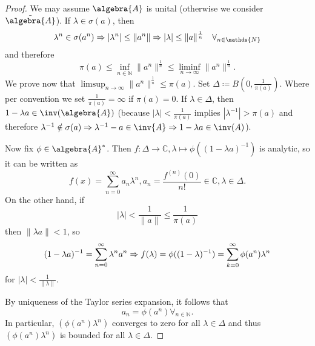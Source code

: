 \documentclass[a4paper]{article}
\begin{document}
\begin{proof}
	We may assume $\algebra{A}$ is unital (otherwise we consider $\tilde{\algebra{A}}$). If $\lambda \in \sigma(a)$, then
	\begin{equation*}
		\lambda^n \in \sigma(a^n) \then |\lambda^n| \leq \| a^n \| \then |\lambda| \leq \|a\|^{\frac{1}{n}} \quad \forall_{n \in \mathds{N}}
	\end{equation*}
	and therefore
	\begin{equation*}
		\pi(a) \leq \inf_{n \in \mathds{N}} \|a^n\|^{\frac{1}{n}} \leq \liminf_{n \to \infty} \|a^n\|^{\frac{1}{n}}\text{.}
	\end{equation*}
	We prove now that $\limsup_{n \to \infty} \|a^n\|^{\frac{1}{n}} \leq \pi(a)$. Set $\Delta \coloneq B\left(0, \frac{1}{\pi(a)}\right)$. Where per convention we set $\frac{1}{\pi(a)} = \infty$ if $\pi(a) = 0$. If $\lambda \in \Delta$, then $1 - \lambda a \in \inv(\algebra{A})$ (because $|\lambda| < \frac{1}{\pi(a)}$ implies $|\lambda^{-1}| > \pi(a)$ and therefore $\lambda^{-1} \notin \sigma(a) \then \lambda^{-1} - a \in \inv{A} \then 1 - \lambda a \in \inv(A)$).

	Now fix $\phi \in \algebra{A}^*$. Then $f: \Delta \to \mathds{C}, \lambda \mapsto \phi((1 - \lambda a)^{-1})$ is analytic, so it can be written as
	\begin{equation*}
		f(x) = \sum_{n = 0}^{\infty} a_n \lambda^n, a_n = \frac{f^{(n)}(0)}{n!} \in \mathds{C}, \lambda \in \Delta\text{.}
	\end{equation*}
	On the other hand, if 
	\begin{equation*}
		|\lambda| < \frac{1}{\|a\|} \leq \frac{1}{\pi(a)}
	\end{equation*}
	then $\|\lambda a \| < 1$, so
	\begin{equation*}
		(1 - \lambda a)^{-1} = \sum_{n = 0}^{\infty} \lambda^n a^n \then f(\lambda) = \phi((1 - \lambda)^{-1}) = \sum_{k = 0}^{\infty} \phi(a^n) \lambda^n
	\end{equation*}
	for $|\lambda| < \frac{1}{\|\lambda\|}$.

	By uniqueness of the Taylor series expansion, it follows that
	\begin{equation*}
		a_n = \phi(a^n)	 \forall_{n \in \mathds{N}}\text{.}
	\end{equation*}
	In particular, $(\phi(a^n) \lambda^n)$ converges to zero for all $\lambda \in \Delta$ and thus $(\phi(a^n) \lambda^n)$ is bounded for all $\lambda \in \Delta$.


\end{proof}
\end{document}
